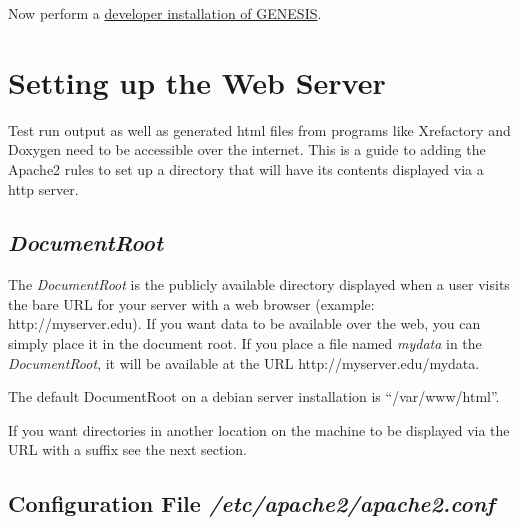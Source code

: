 \documentclass[12pt]{article}
\begin{document}
Now perform a
\href{../installation-developer/installation-developer.tex}{developer
  installation of GENESIS}.


\section*{Setting up the Web Server}

Test run output as well as generated html files from programs like Xrefactory and Doxygen need to be accessible over the internet. This is a guide to adding the Apache2 rules to set up a directory that will have its contents displayed via a http server.

\subsection*{\it DocumentRoot}

The {\it DocumentRoot} is the publicly available directory displayed when a user visits the bare URL for your server with a web browser (example: http://myserver.edu). If you want data to be available over the web, you can simply place it in the document root. If you place a file named {\it mydata} in the {\it DocumentRoot}, it will be available at the URL http://myserver.edu/mydata.

The default DocumentRoot on a debian server installation is ``/var/www/html''. 

If you want directories in another location on the machine to be displayed via the URL with a suffix see the next section.

\subsection*{Configuration File {\it /etc/apache2/apache2.conf}}
\end{document}
